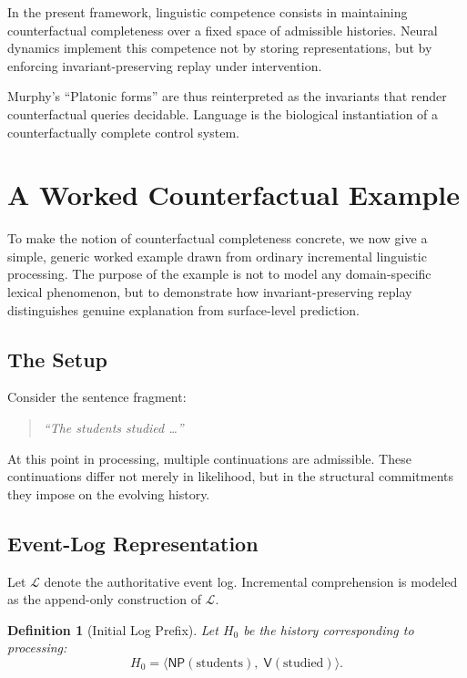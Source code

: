 \documentclass[11pt]{article}
\newtheorem{definition}{Definition}
\begin{document}
In the present framework, linguistic competence consists in maintaining counterfactual completeness over a fixed space of admissible histories. Neural dynamics implement this competence not by storing representations, but by enforcing invariant-preserving replay under intervention.

Murphy’s “Platonic forms” are thus reinterpreted as the invariants that render counterfactual queries decidable. Language is the biological instantiation of a counterfactually complete control system.

\section{A Worked Counterfactual Example}
\label{sec:worked_counterfactual}

To make the notion of counterfactual completeness concrete, we now give a simple, generic worked example drawn from ordinary incremental linguistic processing. The purpose of the example is not to model any domain-specific lexical phenomenon, but to demonstrate how invariant-preserving replay distinguishes genuine explanation from surface-level prediction.

\subsection{The Setup}

Consider the sentence fragment:

\begin{quote}
\emph{“The students studied …”}
\end{quote}

At this point in processing, multiple continuations are admissible. These continuations differ not merely in likelihood, but in the structural commitments they impose on the evolving history.

\subsection{Event-Log Representation}

Let $\mathcal{L}$ denote the authoritative event log. Incremental comprehension is modeled as the append-only construction of $\mathcal{L}$.

\begin{definition}[Initial Log Prefix]
Let $H_0$ be the history corresponding to processing:
\[
H_0 = \langle \mathsf{NP}(\text{students}),\;
\mathsf{V}(\text{studied}) \rangle.
\]
\end{definition}
\end{document}
